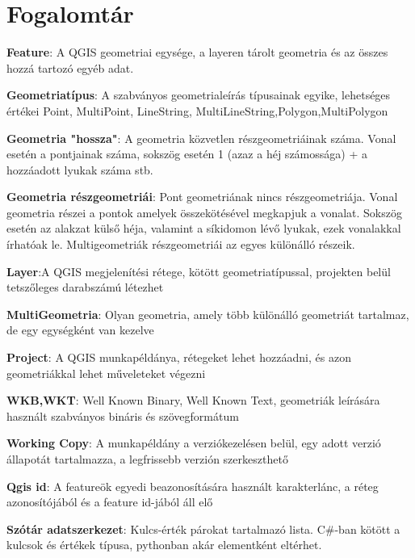 \section{Fogalomtár}
\begin{definition}
	\label{def:1}
	\textbf{Feature}: A QGIS geometriai egysége, a layeren tárolt geometria és az összes hozzá tartozó egyéb adat.
\end{definition}
\begin{definition}
	\label{def:2}
	\textbf{Geometriatípus}: A szabványos geometrialeírás típusainak egyike, lehetséges értékei Point, MultiPoint, LineString, MultiLineString,Polygon,MultiPolygon
\end{definition}
\begin{definition}
	\label{def:3}
	\textbf{Geometria "hossza"}: A geometria közvetlen részgeometriáinak száma. Vonal esetén a pontjainak száma, sokszög esetén 1 (azaz a héj számossága) + a hozzáadott lyukak száma stb.
\end{definition}
\begin{definition}
	\label{def:4}
	\textbf{Geometria részgeometriái}: Pont geometriának nincs részgeometriája. Vonal geometria részei a pontok amelyek összekötésével megkapjuk a vonalat. Sokszög esetén az alakzat külső héja, valamint a síkidomon lévő lyukak, ezek vonalakkal írhatóak le. Multigeometriák részgeometriái az egyes különálló részeik.
\end{definition}
\begin{definition}
	\label{def:5}
	\textbf{Layer}:A QGIS megjelenítési rétege, kötött geometriatípussal, projekten belül tetszőleges darabszámú létezhet
\end{definition}
\begin{definition}
	\label{def:6}
	\textbf{MultiGeometria}: Olyan geometria, amely több különálló geometriát tartalmaz, de egy egységként van kezelve
\end{definition}
\begin{definition}
	\label{def:7}
	\textbf{Project}: A QGIS munkapéldánya, rétegeket lehet hozzáadni, és azon geometriákkal lehet műveleteket végezni
\end{definition}
\begin{definition}
	\label{def:8}
	\textbf{WKB,WKT}: Well Known Binary, Well Known Text, geometriák leírására használt szabványos bináris és szövegformátum
\end{definition}
\begin{definition}
	\label{def:9}
	\textbf{Working Copy}: A munkapéldány a verziókezelésen belül, egy adott verzió állapotát tartalmazza, a legfrissebb verzión szerkeszthető
\end{definition}
\begin{definition}
	\label{def:10}
	\textbf{Qgis id}: A featureök egyedi beazonosítására használt karakterlánc, a réteg azonosítójából és a feature id-jából áll elő
\end{definition}
\begin{definition}
	\label{def:11}
	\textbf{Szótár adatszerkezet}: Kulcs-érték párokat tartalmazó lista. C\#-ban kötött a kulcsok és értékek típusa, pythonban akár elementként eltérhet.
\end{definition}